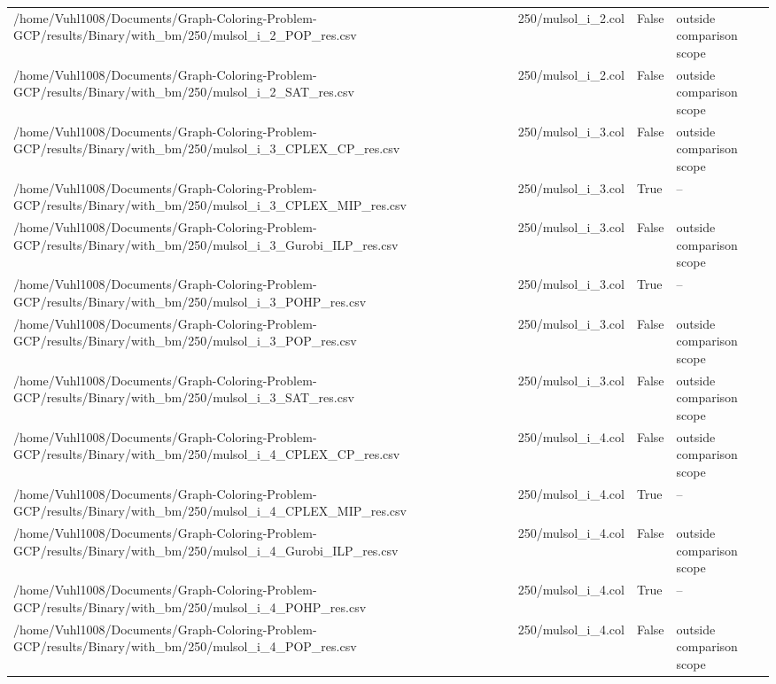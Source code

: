 \begin{table}[htbp]
\begin{tabular}{llll}
/home/Vuhl1008/Documents/Graph-Coloring-Problem-GCP/results/Binary/with\_bm/250/mulsol\_i\_2\_POP\_res.csv & 250/mulsol\_i\_2.col & False & outside comparison scope \\
/home/Vuhl1008/Documents/Graph-Coloring-Problem-GCP/results/Binary/with\_bm/250/mulsol\_i\_2\_SAT\_res.csv & 250/mulsol\_i\_2.col & False & outside comparison scope \\
/home/Vuhl1008/Documents/Graph-Coloring-Problem-GCP/results/Binary/with\_bm/250/mulsol\_i\_3\_CPLEX\_CP\_res.csv & 250/mulsol\_i\_3.col & False & outside comparison scope \\
/home/Vuhl1008/Documents/Graph-Coloring-Problem-GCP/results/Binary/with\_bm/250/mulsol\_i\_3\_CPLEX\_MIP\_res.csv & 250/mulsol\_i\_3.col & True & -- \\
/home/Vuhl1008/Documents/Graph-Coloring-Problem-GCP/results/Binary/with\_bm/250/mulsol\_i\_3\_Gurobi\_ILP\_res.csv & 250/mulsol\_i\_3.col & False & outside comparison scope \\
/home/Vuhl1008/Documents/Graph-Coloring-Problem-GCP/results/Binary/with\_bm/250/mulsol\_i\_3\_POHP\_res.csv & 250/mulsol\_i\_3.col & True & -- \\
/home/Vuhl1008/Documents/Graph-Coloring-Problem-GCP/results/Binary/with\_bm/250/mulsol\_i\_3\_POP\_res.csv & 250/mulsol\_i\_3.col & False & outside comparison scope \\
/home/Vuhl1008/Documents/Graph-Coloring-Problem-GCP/results/Binary/with\_bm/250/mulsol\_i\_3\_SAT\_res.csv & 250/mulsol\_i\_3.col & False & outside comparison scope \\
/home/Vuhl1008/Documents/Graph-Coloring-Problem-GCP/results/Binary/with\_bm/250/mulsol\_i\_4\_CPLEX\_CP\_res.csv & 250/mulsol\_i\_4.col & False & outside comparison scope \\
/home/Vuhl1008/Documents/Graph-Coloring-Problem-GCP/results/Binary/with\_bm/250/mulsol\_i\_4\_CPLEX\_MIP\_res.csv & 250/mulsol\_i\_4.col & True & -- \\
/home/Vuhl1008/Documents/Graph-Coloring-Problem-GCP/results/Binary/with\_bm/250/mulsol\_i\_4\_Gurobi\_ILP\_res.csv & 250/mulsol\_i\_4.col & False & outside comparison scope \\
/home/Vuhl1008/Documents/Graph-Coloring-Problem-GCP/results/Binary/with\_bm/250/mulsol\_i\_4\_POHP\_res.csv & 250/mulsol\_i\_4.col & True & -- \\
/home/Vuhl1008/Documents/Graph-Coloring-Problem-GCP/results/Binary/with\_bm/250/mulsol\_i\_4\_POP\_res.csv & 250/mulsol\_i\_4.col & False & outside comparison scope \\

\end{tabular}
\end{table}
